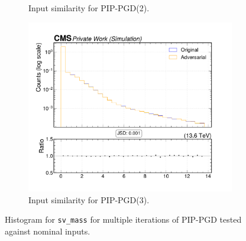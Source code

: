 \begin{figure}[htbp]
\begin{subfigure}[t]{0.32\textwidth}
    \caption*{Input similarity for PIP-PGD(2).}
  \end{subfigure}\hfill
  \begin{subfigure}[t]{0.32\textwidth}
    \includegraphics[width=\linewidth]{media/output/features/compare/combined_it_3/cmp_vtx_arr_sv_mass.pdf}
    \caption*{Input similarity for PIP-PGD(3).}
  \end{subfigure}

  \caption*{Histogram for \texttt{sv\_mass} for multiple iterations of PIP-PGD tested against nominal inputs.}
  \label{fig:combined_input_sv_mass}
\end{figure}

